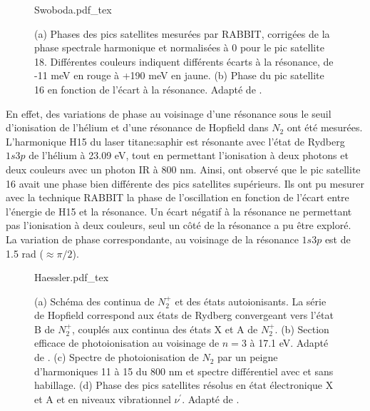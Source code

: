 \begin{figure}
\centering
\def\svgwidth{0.8\textwidth}
{Swoboda.pdf_tex}
\caption{(a) Phases des pics satellites mesurées par RABBIT, corrigées de la phase spectrale harmonique et normalisées à 0 pour le pic satellite 18. Différentes couleurs indiquent différents écarts à la résonance, de -11 meV en rouge à +190 meV en jaune. (b) Phase du pic satellite 16 en fonction de l'écart à la résonance. Adapté de .}
\label{fig:Swoboda}
\end{figure}

En effet, des variations de phase au voisinage d'une résonance sous le seuil d'ionisation de l'hélium et d'une résonance de Hopfield dans $N_2$ ont été mesurées. L'harmonique H15 du laser titane:saphir est résonante avec l'état de Rydberg $1s3p$ de l'hélium à 23.09 eV, tout en permettant l'ionisation à deux photons et deux couleurs avec un photon IR à 800 nm. Ainsi,  ont observé que le pic satellite 16 avait une phase bien différente des pics satellites supérieurs. Ils ont pu mesurer avec la technique RABBIT la phase de l'oscillation en fonction de l'écart entre l'énergie de H15 et la résonance. Un écart négatif à la résonance ne permettant pas l'ionisation à deux couleurs, seul un côté de la résonance a pu être exploré. La variation de phase correspondante, au voisinage de la résonance $1s3p$ est de 1.5 rad ($\approx \pi/2$).

\begin{figure}
\centering
\def\svgwidth{\textwidth}
{Haessler.pdf_tex}
\caption{(a) Schéma des continua de $N_2^+$ et des états autoionisants. La série de Hopfield correspond aux états de Rydberg convergeant vers l'état B de $N_2^+$, couplés aux continua des états X et A de $N_2^+$. (b) Section efficace de photoionisation au voisinage de $n=3$ à 17.1 eV. Adapté de . (c) Spectre de photoionisation de $N_2$ par un peigne d'harmoniques 11 à 15 du 800 nm et spectre différentiel avec et sans habillage. (d) Phase des pics satellites résolus en état électronique X et A et en niveaux vibrationnel $\nu^{'}$. Adapté de .}
\label{fig:Haessler}
\end{figure}

